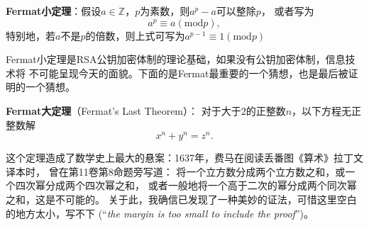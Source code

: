 \begin{shaded}
	\begin{tcolorbox}
		{\bf Fermat小定理}：假设$a\in\mathbb{Z}$，$p$为素数，则$a^p-a$可以整除$p$，
		或者写为
		$$a^p\equiv a(\mathrm{mod}p),$$
		特别地，若$a$不是$p$的倍数，则上式可写为$a^{p-1}\equiv 1(\mathrm{mod} p)$
	\end{tcolorbox}
	
	Fermat小定理是RSA公钥加密体制的理论基础，如果没有公钥加密体制，信息技术将
	不可能呈现今天的面貌。下面的是Fermat最重要的一个猜想，也是最后被证明的一个猜想。
	
	\begin{tcolorbox}
		{\bf Fermat大定理}（Fermat's Last Theorem）：
		对于大于$2$的正整数$n$，以下方程无正整数解
		$$x^n+y^n=z^n.$$
	\end{tcolorbox}
	
	这个定理造成了数学史上最大的悬案：1637年，费马在阅读丢番图《算术》拉丁文译本时，
	曾在第11卷第8命题旁写道：
	{\kaishu 将一个立方数分成两个立方数之和，或一个四次幂分成两个四次幂之和，
	或者一般地将一个高于二次的幂分成两个同次幂之和，这是不可能的。
	关于此，我确信已发现了一种美妙的证法，可惜这里空白的地方太小，写不下
	(“{\it the margin is too small to include the proof}”)。}
	

\end{shaded}
